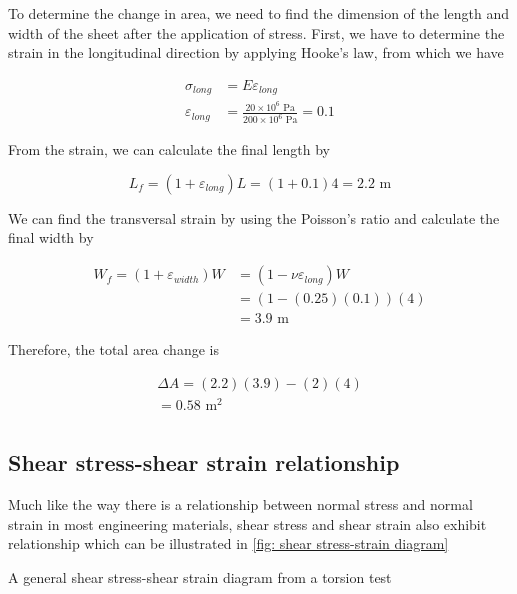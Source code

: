 \documentclass[
10pt,
a4paper,
openany,
svgnames,
]{kaobook} %
\begin{document}
\begin{solution}
To determine the change in area, we need to find the dimension of the length and width of the sheet after the application of stress. First, we have to determine the strain in the longitudinal direction by applying Hooke’s law, from which we have

\begin{align*}
  \sigma _{long} &= E{\varepsilon _{long}} \\
  \varepsilon _{long} &= \frac{20 \times 10^6 \text{ Pa}}{200 \times 10^6 \text{ Pa}} = 0.1
\end{align*}

From the strain, we can calculate the final length by

\[{L_f} = (1 + {\varepsilon _{long}}){L} = (1 + 0.1)4 = 2.2 \text{ m}\]

We can find the transversal strain by using the Poisson’s ratio and calculate the final width by

\begin{align*}
  W_{f} = (1 + {\varepsilon _{width}})W & = (1 - \nu {\varepsilon _{long}})W \\ 
                                        & = (1 - (0.25)(0.1))(4) \\ 
                                        &= 3.9 \text{ m} 
\end{align*}

Therefore, the total area change is

\[\begin{gathered}
  \Delta A = (2.2)(3.9) - (2)(4) \\ 
   = 0.58 \text{ m}^2 \\ 
\end{gathered} \]
\end{solution}

\subsection{Shear stress-shear strain relationship}

Much like the way there is a relationship between normal stress and normal strain in most engineering materials, shear stress and shear strain also exhibit relationship which can be illustrated in \cref{fig: shear stress-strain diagram}

\begin{marginfigure}
  \caption{A general shear stress-shear strain diagram from a torsion test}
  \label{fig: shear stress-strain diagram}
\end{marginfigure}
\end{document}
